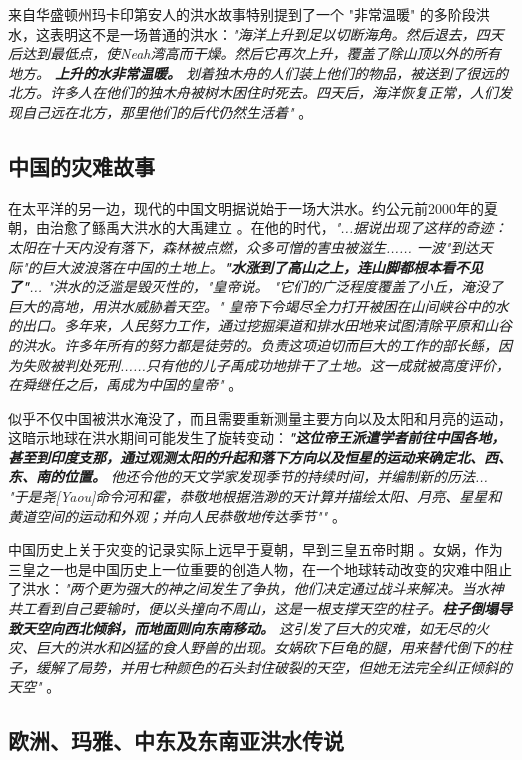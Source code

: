 \documentclass[10pt,twocolumn,letterpaper]{article}
\begin{document}
来自华盛顿州玛卡印第安人的洪水故事特别提到了一个 "非常温暖" 的多阶段洪水，这表明这不是一场普通的洪水：\textit{"海洋上升到足以切断海角。然后退去，四天后达到最低点，使Neah湾高而干燥。然后它再次上升，覆盖了除山顶以外的所有地方。 \textbf{上升的水非常温暖。} 划着独木舟的人们装上他们的物品，被送到了很远的北方。许多人在他们的独木舟被树木困住时死去。四天后，海洋恢复正常，人们发现自己远在北方，那里他们的后代仍然生活着"} \cite{3}。

\subsection{中国的灾难故事}

在太平洋的另一边，现代的中国文明据说始于一场大洪水。约公元前2000年的夏朝，由治愈了鲧禹大洪水的大禹建立 \cite{6}。在他的时代，\textit{"...据说出现了这样的奇迹：太阳在十天内没有落下，森林被点燃，众多可憎的害虫被滋生...... 一波"到达天际"的巨大波浪落在中国的土地上。\textbf{"水涨到了高山之上，连山脚都根本看不见了"}... "洪水的泛滥是毁灭性的，"皇帝说。 "它们的广泛程度覆盖了小丘，淹没了巨大的高地，用洪水威胁着天空。" 皇帝下令竭尽全力打开被困在山间峡谷中的水的出口。多年来，人民努力工作，通过挖掘渠道和排水田地来试图清除平原和山谷的洪水。许多年所有的努力都是徒劳的。负责这项迫切而巨大的工作的部长鲧，因为失败被判处死刑......只有他的儿子禹成功地排干了土地。这一成就被高度评价，在舜继任之后，禹成为中国的皇帝"} \cite{5}。

似乎不仅中国被洪水淹没了，而且需要重新测量主要方向以及太阳和月亮的运动，这暗示地球在洪水期间可能发生了旋转变动：\textit{\textbf{"这位帝王派遣学者前往中国各地，甚至到印度支那，通过观测太阳的升起和落下方向以及恒星的运动来确定北、西、东、南的位置。} 他还令他的天文学家发现季节的持续时间，并编制新的历法... "于是尧[Yaou]命令河和霍，恭敬地根据浩渺的天计算并描绘太阳、月亮、星星和黄道空间的运动和外观；并向人民恭敬地传达季节""} \cite{5}。

中国历史上关于灾变的记录实际上远早于夏朝，早到三皇五帝时期 \cite{7}。女娲，作为三皇之一也是中国历史上一位重要的创造人物，在一个地球转动改变的灾难中阻止了洪水：\textit{"两个更为强大的神之间发生了争执，他们决定通过战斗来解决。当水神共工看到自己要输时，便以头撞向不周山，这是一根支撑天空的柱子。\textbf{柱子倒塌导致天空向西北倾斜，而地面则向东南移动。} 这引发了巨大的灾难，如无尽的火灾、巨大的洪水和凶猛的食人野兽的出现。女娲砍下巨龟的腿，用来替代倒下的柱子，缓解了局势，并用七种颜色的石头封住破裂的天空，但她无法完全纠正倾斜的天空"} \cite{8}。

\subsection{欧洲、玛雅、中东及东南亚洪水传说}
\end{document}

